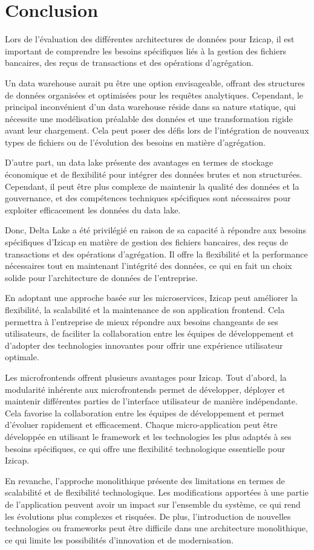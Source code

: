 \section*{Conclusion}
Lors de l'évaluation des différentes architectures de données pour Izicap, il est important de comprendre les besoins spécifiques liés à la gestion des fichiers bancaires, des reçus de transactions et des opérations d'agrégation.

Un data warehouse aurait pu être une option envisageable, offrant des structures de données organisées et optimisées pour les requêtes analytiques. Cependant, le principal inconvénient d'un data warehouse réside dans sa nature statique, qui nécessite une modélisation préalable des données et une transformation rigide avant leur chargement. Cela peut poser des défis lors de l'intégration de nouveaux types de fichiers ou de l'évolution des besoins en matière d'agrégation.

D'autre part, un data lake présente des avantages en termes de stockage économique et de flexibilité pour intégrer des données brutes et non structurées. Cependant, il peut être plus complexe de maintenir la qualité des données et la gouvernance, et des compétences techniques spécifiques sont nécessaires pour exploiter efficacement les données du data lake.

Donc, Delta Lake a été privilégié en raison de sa capacité à répondre aux besoins spécifiques d'Izicap en matière de gestion des fichiers bancaires, des reçus de transactions et des opérations d'agrégation. Il offre la flexibilité et la performance nécessaires tout en maintenant l'intégrité des données, ce qui en fait un choix solide pour l'architecture de données de l'entreprise.

En adoptant une approche basée sur les microservices, Izicap peut améliorer la flexibilité, la scalabilité et la maintenance de son application frontend. Cela permettra à l'entreprise de mieux répondre aux besoins changeants de ses utilisateurs, de faciliter la collaboration entre les équipes de développement et d'adopter des technologies innovantes pour offrir une expérience utilisateur optimale.

Les microfrontends offrent plusieurs avantages pour Izicap. Tout d'abord, la modularité inhérente aux microfrontends permet de développer, déployer et maintenir différentes parties de l'interface utilisateur de manière indépendante. Cela favorise la collaboration entre les équipes de développement et permet d'évoluer rapidement et efficacement. Chaque micro-application peut être développée en utilisant le framework et les technologies les plus adaptés à ses besoins spécifiques, ce qui offre une flexibilité technologique essentielle pour Izicap.

En revanche, l'approche monolithique présente des limitations en termes de scalabilité et de flexibilité technologique. Les modifications apportées à une partie de l'application peuvent avoir un impact sur l'ensemble du système, ce qui rend les évolutions plus complexes et risquées. De plus, l'introduction de nouvelles technologies ou frameworks peut être difficile dans une architecture monolithique, ce qui limite les possibilités d'innovation et de modernisation.

